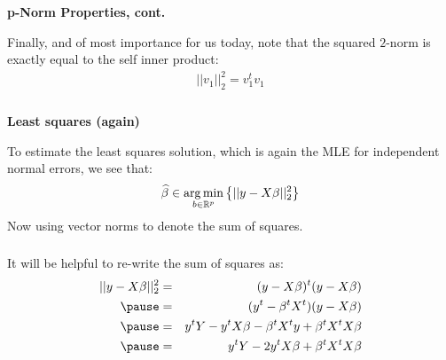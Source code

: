 \begin{frame}[fragile] \frametitle{}

{\bf p-Norm Properties, cont.}

Finally, and of most importance for us today, note that
the squared $2$-norm is exactly equal to the self inner
product:
\begin{align*}
|| v_1 ||_2^2 = v_1^t v_1
\end{align*}

\end{frame}

\begin{frame}[fragile] \frametitle{}

{\bf Least squares (again)}

To estimate the least squares solution, which is again the
MLE for independent normal errors, we see that:
\begin{align*}
\widehat{\beta} \in \mathop{\mathrm{arg\,min}}_{b \in \mathbb{R}^p} \left\{ ||y - X \beta ||_2^2 \right\}
\end{align*}
\pause Now using vector norms to denote the sum of
squares.

\end{frame}

\begin{frame}[fragile] \frametitle{}

It will be helpful to re-write the sum of squares as:
\begin{eqnarray*}
||y - X \beta ||_2^2 &=& (y - X\beta)^t (y - X\beta) \\ \pause
&=& (y^t - \beta^t X^t) (y - X\beta) \\ \pause
&=& y^tY - y^t X\beta - \beta^t X^t y + \beta^t X^t X\beta \\ \pause
&=& y^tY - 2 y^t X\beta + \beta^t X^t X\beta
\end{eqnarray*}

\end{frame}

